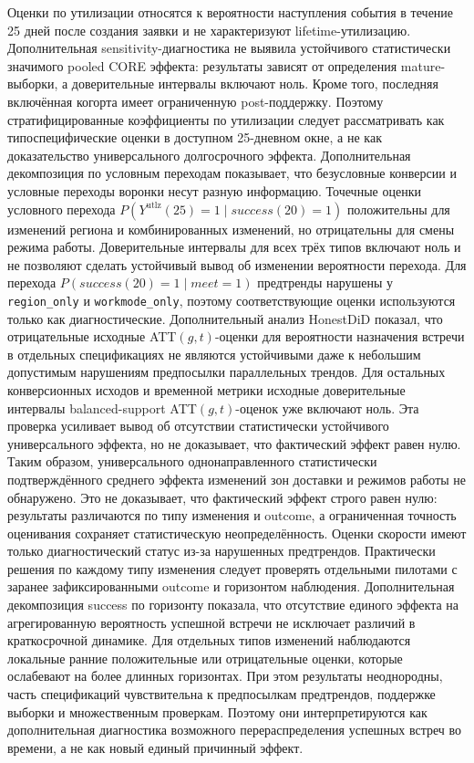 \documentclass[14pt,a4paper]{extarticle}
\begin{document}
Оценки по утилизации относятся к вероятности наступления события в течение
25 дней после создания заявки и не характеризуют lifetime-утилизацию.
Дополнительная sensitivity-диагностика не выявила устойчивого статистически
значимого pooled CORE эффекта: результаты зависят от определения
mature-выборки, а доверительные интервалы включают ноль. Кроме того,
последняя включённая когорта имеет ограниченную post-поддержку. Поэтому
стратифицированные коэффициенты по утилизации следует рассматривать как
типоспецифические оценки в доступном 25-дневном окне, а не как доказательство
универсального долгосрочного эффекта.
Дополнительная декомпозиция по условным переходам показывает, что безусловные
конверсии и условные переходы воронки несут разную информацию. Точечные оценки
условного перехода \(P(Y^{\mathrm{utlz}}(25)=1 \mid success(20)=1)\) положительны
для изменений региона и комбинированных изменений, но отрицательны для смены
режима работы. Доверительные интервалы для всех трёх типов включают ноль и не
позволяют сделать устойчивый вывод об изменении вероятности перехода. Для
перехода \(P(success(20)=1 \mid meet=1)\) предтренды нарушены у
\texttt{region\_only} и \texttt{workmode\_only}, поэтому соответствующие оценки
используются только как диагностические.
Дополнительный анализ HonestDiD показал, что отрицательные исходные ATT\((g,t)\)-оценки для вероятности назначения встречи в отдельных спецификациях не являются устойчивыми даже к небольшим допустимым нарушениям предпосылки параллельных трендов. Для остальных конверсионных исходов и временной метрики исходные доверительные интервалы balanced-support ATT\((g,t)\)-оценок уже включают ноль. Эта проверка усиливает вывод об отсутствии статистически устойчивого универсального эффекта, но не доказывает, что фактический эффект равен нулю.
Таким образом, универсального однонаправленного статистически подтверждённого среднего эффекта изменений зон доставки и режимов работы не обнаружено. Это не доказывает, что фактический эффект строго равен нулю: результаты различаются по типу изменения и outcome, а ограниченная точность оценивания сохраняет статистическую неопределённость. Оценки скорости имеют только диагностический статус из-за нарушенных предтрендов. Практически решения по каждому типу изменения следует проверять отдельными пилотами с заранее зафиксированными outcome и горизонтом наблюдения.
Дополнительная декомпозиция success по горизонту показала, что отсутствие единого эффекта на агрегированную вероятность успешной встречи не исключает различий в краткосрочной динамике. Для отдельных типов изменений наблюдаются локальные ранние положительные или отрицательные оценки, которые ослабевают на более длинных горизонтах. При этом результаты неоднородны, часть спецификаций чувствительна к предпосылкам предтрендов, поддержке выборки и множественным проверкам. Поэтому они интерпретируются как дополнительная диагностика возможного перераспределения успешных встреч во времени, а не как новый единый причинный эффект.
\end{document}
